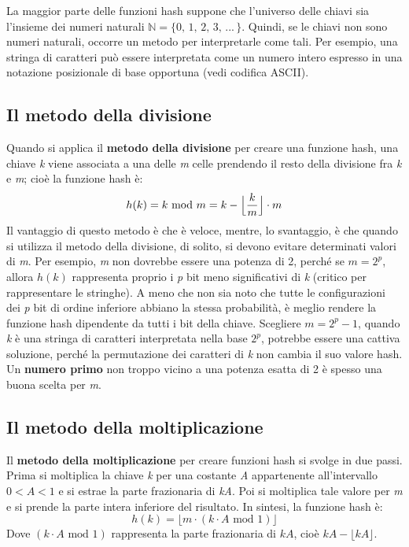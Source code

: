 \documentclass[10pt, a4paper]{report}
\begin{document}
La maggior parte delle funzioni hash suppone che l'universo delle chiavi sia l'insieme dei numeri naturali $\mathbb{N} = \{0,\,1,\,2,\,3,\,...\,\}$. Quindi, se le chiavi non sono numeri naturali, occorre un metodo per interpretarle come tali. Per esempio, una stringa di caratteri può essere interpretata come un numero intero espresso in una notazione posizionale di base opportuna (vedi codifica ASCII).
\subsection{Il metodo della divisione}
Quando si applica il \textbf{metodo della divisione} per creare una funzione hash, una chiave \textit{k} viene associata a una delle \textit{m} celle prendendo il resto della divisione fra \textit{k} e \textit{m}; cioè la funzione hash è:
\begin{equation*}
h(k) = k \text{ mod } m = k - \Bigl\lfloor \frac{k}{m} \Bigr\rfloor \cdot m
\end{equation*}
Il vantaggio di questo metodo è che è veloce, mentre, lo svantaggio, è che quando si utilizza il metodo della divisione, di solito, si devono evitare determinati valori di \textit{m}. Per esempio, \textit{m} non dovrebbe essere una potenza di 2, perché se $m = 2^p$, allora $h(k)$ rappresenta proprio i \textit{p} bit meno significativi di \textit{k} (critico per rappresentare le stringhe). A meno che non sia noto che tutte le configurazioni dei \textit{p} bit di ordine inferiore abbiano la stessa probabilità, è meglio rendere la funzione hash dipendente da tutti i bit della chiave. Scegliere $m = 2^p - 1$, quando \textit{k} è una stringa di caratteri interpretata nella base $2^p$, potrebbe essere una cattiva soluzione, perché la permutazione dei caratteri di \textit{k} non cambia il suo valore hash. Un \textbf{numero primo} non troppo vicino a una potenza esatta di 2 è spesso una buona scelta per \textit{m}.
\subsection{Il metodo della moltiplicazione}
Il \textbf{metodo della moltiplicazione} per creare funzioni hash si svolge in due passi. Prima si moltiplica la chiave \textit{k} per una costante \textit{A} appartenente all'intervallo $0 < A < 1$ e si estrae la parte frazionaria di \textit{kA}. Poi si moltiplica tale valore per \textit{m} e si prende la parte intera inferiore del risultato. In sintesi, la funzione hash è:
\begin{equation*}
h(k) = \lfloor m \cdot (k \cdot A \text{ mod } 1) \rfloor
\end{equation*}
Dove $(k \cdot A \text{ mod } 1)$ rappresenta la parte frazionaria di $kA$, cioè $kA - \lfloor kA \rfloor$.
\end{document}
